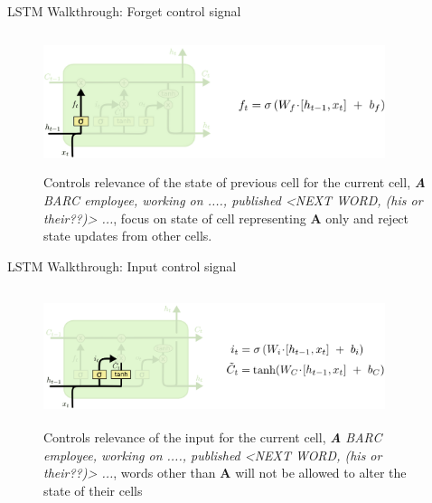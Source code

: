 \documentclass{beamer}
\begin{document}
\begin{frame}{LSTM Walkthrough: Forget control signal}
    \begin{center}
       \begin{figure}
           \centering
                \includegraphics[width=10cm, height=4cm]{images/lstm_cell_ft_colah.png}
                \caption{Controls relevance of the state of previous cell for the current cell, \textit{\textbf{A} BARC employee, working on ...., published \big<NEXT WORD, \textit{(his or their??)}\big> ...}, focus on state of cell representing \textbf{A} only and reject state updates from other cells.}
        \end{figure}   
    \end{center}
\end{frame}

\begin{frame}{LSTM Walkthrough: Input control signal}
    \begin{center}
       \begin{figure}
           \centering
                \includegraphics[width=10cm, height=4cm]{images/lstm_cell_c_t_colah.png}
                \caption{Controls relevance of the input for the current cell, \textit{\textbf{A} BARC employee, working on ...., published \big<NEXT WORD, \textit{(his or their??)}\big> ...}, words other than \textbf{A} will not be allowed to alter the state of their cells}
        \end{figure} 
        
        
        
        
    \end{center}
\end{frame}
\end{document}
